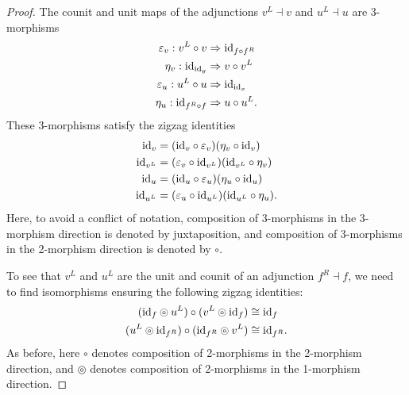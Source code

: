 \documentclass{amsart}
\begin{document}
\begin{proof}
The counit and unit maps of the adjunctions $v^L \dashv v$ and $u^L \dashv u$ are 3-morphisms
\begin{align*}
	\varepsilon_v: v^L \circ v & \Rightarrow \mathrm{id}_{f \circ f^R} \\
	\eta_v: \mathrm{id}_{\mathrm{id}_y} & \Rightarrow v \circ v^L \\
	\varepsilon_u: u^L \circ u & \Rightarrow \mathrm{id}_{\mathrm{id}_x} \\
	\eta_u: \mathrm{id}_{f^R \circ f} & \Rightarrow  u \circ u^L.
\end{align*}
These 3-morphisms satisfy the zigzag identities
\begin{align*}
	 \mathrm{id}_v  &= (\mathrm{id}_v \circ \varepsilon_v) (\eta_v \circ \mathrm{id}_v)  \\
	 \mathrm{id}_{v^L}  &= (\varepsilon_v \circ \mathrm{id}_{v^L} ) (\mathrm{id}_{v^L} \circ \eta_v)  \\
	 \mathrm{id}_u  &= (\mathrm{id}_u \circ \varepsilon_u) (\eta_u \circ \mathrm{id}_u)  \\
	 \mathrm{id}_{u^L}  &= (\varepsilon_u \circ \mathrm{id}_{u^L} ) (\mathrm{id}_{u^L} \circ \eta_u).  
\end{align*}
Here, to avoid a conflict of notation, composition of 3-morphisms in the 3-morphism direction is denoted by juxtaposition, and composition of 3-morphisms in the 2-morphism direction is denoted by $\circ$.

To see that $v^L$ and $u^L$ are the unit and counit of an adjunction $f^R \dashv f$, we need to find isomorphisms ensuring the following zigzag identities:
\begin{align*}
	 (\mathrm{id}_{f} \circledcirc u^L) \circ (v^L \circledcirc \mathrm{id}_{f} ) & \cong \mathrm{id}_{f} \\
 	 (u^L \circledcirc \mathrm{id}_{f^R}) \circ (\mathrm{id}_{f^R} \circledcirc v^L) & \cong \mathrm{id}_{f^R}. 
\end{align*}
As before, here $\circ$ denotes composition of 2-morphisms in the 2-morphism direction, and $\circledcirc$ denotes composition of 2-morphisms in the 1-morphism direction.


\end{proof}
\end{document}
